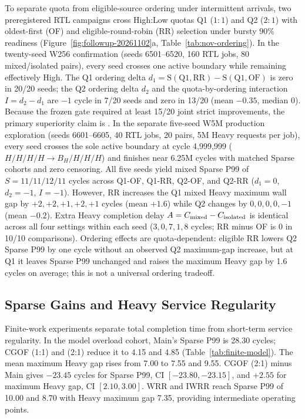 To separate quota from eligible-source ordering under intermittent arrivals, two preregistered RTL campaigns cross High:Low quotas Q1 ($1:1$) and Q2 ($2:1$) with oldest-first (OF) and eligible-round-robin (RR) selection under bursty 90\% readiness (Figure~\ref{fig:followup-20261102}a, Table~\ref{tab:nov-ordering}). In the twenty-seed W256 confirmation (seeds 6501--6520, 160 RTL jobs, 80 mixed/isolated pairs), every seed crosses one active boundary while remaining effectively High. The Q1 ordering delta $d_1=\mathrm{S(Q1,RR)}-\mathrm{S(Q1,OF)}$ is zero in 20/20 seeds; the Q2 ordering delta $d_2$ and the quota-by-ordering interaction $I=d_2-d_1$ are $-1$ cycle in 7/20 seeds and zero in 13/20 (mean $-0.35$, median $0$). Because the frozen gate required at least 15/20 joint strict improvements, the primary superiority claim is . In the separate five-seed W5M production exploration (seeds 6601--6605, 40 RTL jobs, 20 pairs, 5M Heavy requests per job), every seed crosses the sole active boundary at cycle 4,999,999 ($H/H/H/H\rightarrow B_H/H/H/H$) and finishes near 6.25M cycles with matched Sparse cohorts and zero censoring. All five seeds yield mixed Sparse P99 of $S=11/11/12/11$ cycles across Q1-OF, Q1-RR, Q2-OF, and Q2-RR ($d_1=0$, $d_2=-1$, $I=-1$). However, RR increases the Q1 mixed Heavy maximum wall gap by $+2,+2,+1,+2,+1$ cycles (mean $+1.6$) while Q2 changes by $0,0,0,0,-1$ (mean $-0.2$). Extra Heavy completion delay $A=C_{\rm mixed}-C_{\rm isolated}$ is identical across all four settings within each seed ($3,0,7,1,8$ cycles; RR minus OF is $0$ in 10/10 comparisons). Ordering effects are quota-dependent: eligible RR lowers Q2 Sparse P99 by one cycle without an observed Q2 maximum-gap increase, but at Q1 it leaves Sparse P99 unchanged and raises the maximum Heavy gap by 1.6 cycles on average; this is not a universal ordering tradeoff.

\subsection{Sparse Gains and Heavy Service Regularity}

Finite-work experiments separate total completion time from short-term service regularity. In the model overload cohort, Main's Sparse P99 is 28.30 cycles; CGOF (1:1) and (2:1) reduce it to 4.15 and 4.85 (Table~\ref{tab:finite-model}). The mean maximum Heavy gap rises from 7.00 to 7.55 and 9.55. CGOF (2:1) minus Main gives $-23.45$ cycles for Sparse P99, CI $[-23.80,-23.15]$, and $+2.55$ for maximum Heavy gap, CI $[2.10,3.00]$. WRR and IWRR reach Sparse P99 of 10.00 and 8.70 with Heavy maximum gap 7.35, providing intermediate operating points.

